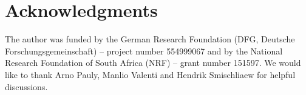 %


\section*{Acknowledgments}
The author was funded by the German Research Foundation (DFG, Deutsche Forschungsgemeinschaft) -- project number 554999067 and by the National Research Foundation of South Africa (NRF) -- grant number 151597.
We would like to thank Arno Pauly, Manlio Valenti and Hendrik Smischliaew for helpful discussions.




